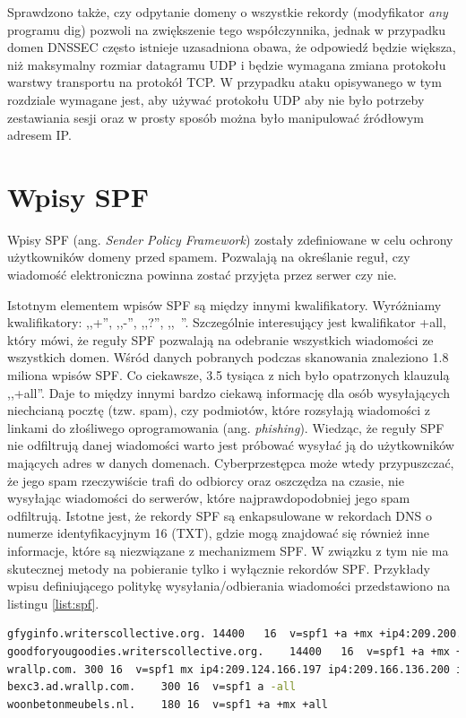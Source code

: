 Sprawdzono także, czy odpytanie domeny o wszystkie
rekordy (modyfikator \textit{any} programu dig) pozwoli na zwiększenie tego współczynnika, jednak w przypadku domen DNSSEC często
istnieje uzasadniona obawa, że odpowiedź będzie większa, niż maksymalny rozmiar datagramu UDP i będzie wymagana zmiana
protokołu warstwy transportu na protokół TCP. W przypadku ataku opisywanego w tym rozdziale wymagane jest, aby używać protokołu UDP
aby nie było potrzeby zestawiania sesji oraz w prosty sposób można było manipulować źródłowym adresem IP.

\section{Wpisy SPF}
\noindent Wpisy SPF (ang. \textit{Sender Policy Framework}) zostały zdefiniowane w celu ochrony użytkowników domeny przed spamem. Pozwalają na określanie reguł, czy wiadomość
elektroniczna powinna zostać przyjęta przez serwer czy nie.

Istotnym elementem wpisów SPF są między innymi kwalifikatory. Wyróżniamy kwalifikatory: ,,+'', ,,-'', ,,?'', ,,~''. Szczególnie
interesujący jest kwalifikator +all, który mówi, że reguły SPF pozwalają na odebranie wszystkich wiadomości ze wszystkich domen.
Wśród danych pobranych podczas skanowania znaleziono 1.8 miliona wpisów SPF. Co ciekawsze, 3.5 tysiąca z nich było opatrzonych
klauzulą ,,+all''. Daje to między innymi bardzo ciekawą informację dla osób wysyłających niechcianą pocztę (tzw. spam), czy
podmiotów, które rozsyłają wiadomości z linkami do złośliwego oprogramowania (ang. \textit{phishing}). Wiedząc,
że reguły SPF nie odfiltrują danej wiadomości warto jest próbować wysyłać ją do użytkowników mających adres w danych domenach.
Cyberprzestępca może wtedy przypuszczać, że jego spam rzeczywiście trafi do odbiorcy oraz oszczędza na czasie, nie wysyłając
wiadomości do serwerów, które najprawdopodobniej jego spam odfiltrują. Istotne jest, że rekordy SPF są enkapsulowane w rekordach DNS
o numerze identyfikacyjnym 16 (TXT), gdzie mogą znajdować się również inne informacje, które są niezwiązane z mechanizmem SPF.
W związku z tym nie ma skutecznej metody na pobieranie tylko i wyłącznie rekordów SPF. Przykłady wpisu definiującego politykę
wysyłania/odbierania wiadomości przedstawiono na listingu \ref{list:spf}.

\begin{lstlisting}[label={list:spf},captionpos=b,caption=Przykład odebranych rekordów SPF.,language=bash]
gfyginfo.writerscollective.org.	14400	16	v=spf1 +a +mx +ip4:209.200.229.240 ~all
goodforyougoodies.writerscollective.org.	14400	16	v=spf1 +a +mx +ip4:209.200.229.240 ~all
wrallp.com.	300	16	v=spf1 mx ip4:209.124.166.197 ip4:209.166.136.200 ip4:4.35.225.147 -all
bexc3.ad.wrallp.com.	300	16	v=spf1 a -all
woonbetonmeubels.nl.	180	16	v=spf1 +a +mx +all
\end{lstlisting}

